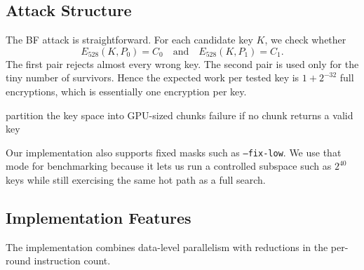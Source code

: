 \documentclass[version=preprint]{iacrcc}
\begin{document}
\subsection{Attack Structure}

The BF attack is straightforward.
For each candidate key $K$, we check whether
\[
E_{528}(K,P_0)=C_0
\quad\text{and}\quad
E_{528}(K,P_1)=C_1.
\]
The first pair rejects almost every wrong key.
The second pair is used only for the tiny number of survivors.
Hence the expected work per tested key is $1 + 2^{-32}$
full encryptions, which is essentially one encryption per key.

\begin{algorithm}[htbp]
\caption{GPU brute-force search for KeeLoq}\label{alg:bruteforce}
\SetAlgoLined
{}
partition the key space into GPU-sized chunks\;
\Return failure if no chunk returns a valid key\;
\end{algorithm}

Our implementation also supports fixed masks such as \texttt{--fix-low}.
We use that mode for benchmarking because it lets us run a controlled subspace such as $2^{40}$ keys while still exercising the same hot path as a full search.

\subsection{Implementation Features}

The implementation combines data-level parallelism with reductions in the per-round instruction count.
\end{document}

